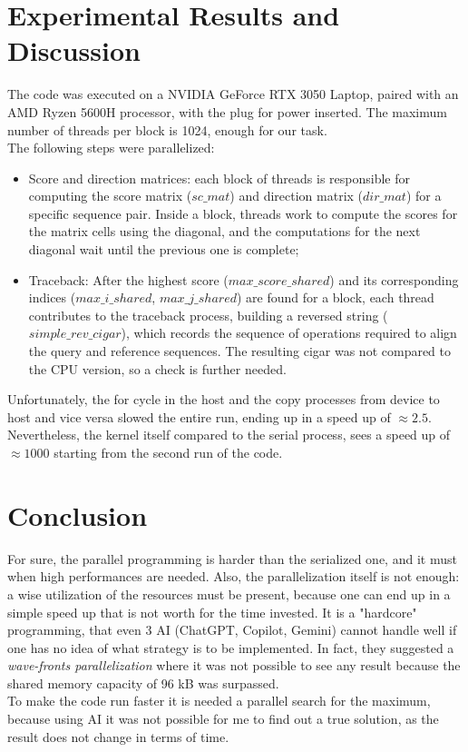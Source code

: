 \documentclass[conference]{IEEEtran}
\begin{document}
	\section{Experimental Results and Discussion}
	The code was executed on a NVIDIA GeForce RTX 3050 Laptop, paired with an AMD Ryzen 5600H processor, with the plug for power inserted. The maximum number of threads per block is 1024, enough for our task.\\
	The following steps were parallelized:
	\begin{itemize}
		\item Score and direction matrices: each block of threads is responsible for computing the score matrix (\(sc\_mat\)) and direction matrix (\(dir\_mat\)) for a specific sequence pair. Inside a block, threads work to compute the scores for the matrix cells using the diagonal, and the computations for the next diagonal wait until the previous one is complete;
		
		\item Traceback: After the highest score (\(max\_score\_shared\)) and its corresponding indices (\(max\_i\_shared\), \(max\_j\_shared\)) are found for a block, each thread contributes to the traceback process, building a reversed string (\(simple\_rev\_cigar\)), which records the sequence of operations required to align the query and reference sequences. The resulting cigar was not compared to the CPU version, so a check is further needed. 
	\end{itemize}
	Unfortunately, the for cycle in the host and the copy processes from device to host and vice versa slowed the entire run, ending up in a speed up of $\approx2.5$. Nevertheless, the kernel itself compared to the serial process, sees a speed up of $\approx1000$ starting from the second run of the code.
	
	\section{Conclusion}
	For sure, the parallel programming is harder than the serialized one, and it must when high performances are needed. Also, the parallelization itself is not enough: a wise utilization of the resources must be present, because one can end up in a simple speed up that is not worth for the time invested. It is a "hardcore" programming, that even 3 AI (ChatGPT, Copilot, Gemini) cannot handle well if one has no idea of what strategy is to be implemented. In fact, they suggested a \textit{wave-fronts parallelization} where it was not possible to see any result because the shared memory capacity of 96 kB was surpassed.\\
	To make the code run faster it is needed a parallel search for the maximum, because using AI it was not possible for me to find out a true solution, as the result does not change in terms of time.
	
\end{document}
